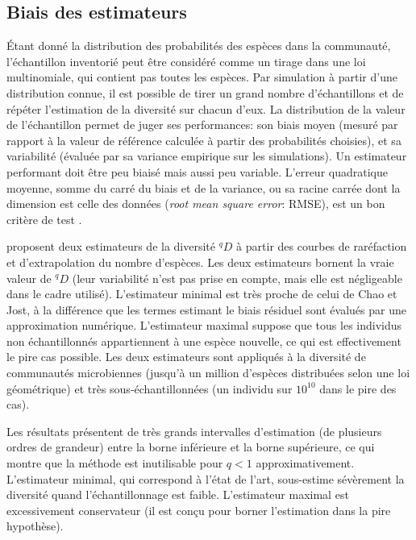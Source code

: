 \documentclass[
  11pt,
  french,
  a4paper,
  extrafontsizes,onecolumn,openright
  ]{memoir}
\newlength{\rf}
\begin{document}
\subsection{Biais des estimateurs}\label{biais-des-estimateurs}

Étant donné la distribution des probabilités des espèces dans la communauté, l'échantillon
inventorié peut être considéré comme un tirage dans une loi multinomiale, qui contient pas toutes les espèces.
Par simulation à partir d'une distribution connue, il est possible de tirer un grand nombre d'échantillons et de répéter l'estimation de la diversité sur chacun d'eux.
La distribution de la valeur de l'échantillon permet de juger ses performances: son biais moyen (mesuré par rapport à la valeur de référence calculée à partir des probabilités choisies), et sa variabilité (évaluée par sa variance empirique sur les simulations).
Un estimateur performant doit être peu biaisé mais aussi peu variable.
L'erreur quadratique moyenne, somme du carré du biais et de la variance, ou sa racine carrée dont la dimension est celle des données (\emph{root mean square error}: RMSE), est un bon critère de test \autocite[voir par exemple][figure 1]{Chao2013}.

\textcite{Haegeman2013} proposent deux estimateurs de la diversité \(^{q}\!D\) à partir des courbes de raréfaction et d'extrapolation du nombre d'espèces.
Les deux estimateurs bornent la vraie valeur de \(^{q}\!D\) (leur variabilité n'est pas prise en compte, mais elle est négligeable dans le cadre utilisé).
L'estimateur minimal est très proche de celui de Chao et Jost, à la différence que les termes estimant le biais résiduel sont évalués par une approximation numérique.
L'estimateur maximal suppose que tous les individus non échantillonnés appartiennent à une espèce nouvelle, ce qui est effectivement le pire cas possible.
Les deux estimateurs sont appliqués à la diversité de communautés microbiennes (jusqu'à un million d'espèces distribuées selon une loi géométrique) et très sous-échantillonnées (un individu sur \(10^{10}\) dans le pire des cas).

Les résultats présentent de très grands intervalles d'estimation (de plusieurs ordres de grandeur) entre la borne inférieure et la borne supérieure, ce qui montre que la méthode est inutilisable pour \(q<1\) approximativement.
L'estimateur minimal, qui correspond à l'état de l'art, sous-estime sévèrement la diversité quand l'échantillonnage est faible.
L'estimateur maximal est excessivement conservateur (il est conçu pour borner l'estimation dans la pire hypothèse).
\end{document}
